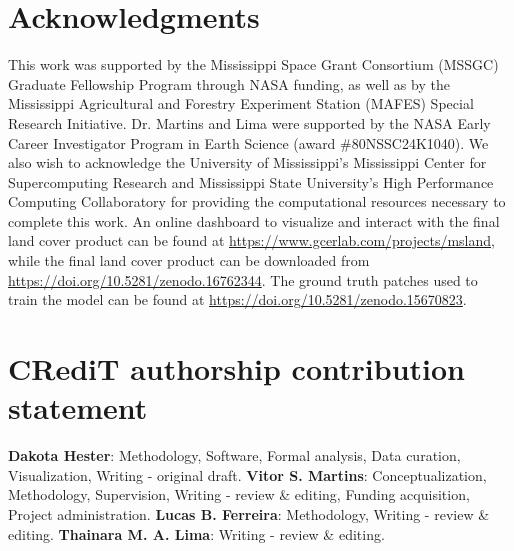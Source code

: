 \documentclass[3p, review, times, authoryear]{elsarticle}
\begin{document}


\section*{Acknowledgments}

This work was supported by the Mississippi Space Grant Consortium (MSSGC) Graduate Fellowship Program through NASA funding, as well as by the Mississippi Agricultural and Forestry Experiment Station (MAFES) Special Research Initiative. 
Dr. Martins and Lima were supported by the NASA Early Career Investigator Program in Earth Science (award \#80NSSC24K1040).
We also wish to acknowledge the University of Mississippi's Mississippi Center for Supercomputing Research and Mississippi State University's High Performance Computing Collaboratory for providing the computational resources necessary to complete this work.
An online dashboard to visualize and interact with the final land cover product can be found at \url{https://www.gcerlab.com/projects/msland}, while the final land cover product can be downloaded from \url{https://doi.org/10.5281/zenodo.16762344}.
The ground truth patches used to train the model can be found at \url{https://doi.org/10.5281/zenodo.15670823}.

\section*{CRediT authorship contribution statement}

\textbf{Dakota Hester}: Methodology, Software, Formal analysis, Data curation, Visualization, Writing - original draft.
\textbf{Vitor S. Martins}: Conceptualization, Methodology, Supervision, Writing - review \& editing, Funding acquisition, Project administration.
\textbf{Lucas B. Ferreira}: Methodology, Writing - review \& editing.
\textbf{Thainara M. A. Lima}: Writing - review \& editing.

% 


\end{document}
